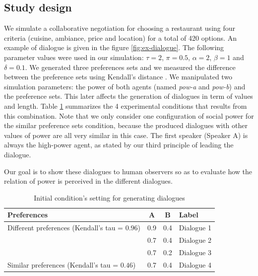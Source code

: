 \documentclass{llncs}
\begin{document}
	\subsection{Study design}
	We simulate a collaborative negotiation for choosing a restaurant using four criteria (cuisine, ambiance, price and location) for a total of 420 options. An example of dialogue is given in the figure \ref{fig:ex-dialogue}. The following parameter values were used in our simulation: $\tau=2$, $\pi=0.5$, $\alpha=2$, $\beta=1$ and $\delta=0.1$. We generated three preferences sets and we measured the difference between the preference sets using Kendall's distance \cite{bra2013Kendall}. We manipulated two simulation parameters: the power of both agents (named \emph{pow-a} and \emph{pow-b}) and the preference sets. This later affects the generation of dialogues in term of values and length.  Table \ref{table:conditions} summarizes the 4 experimental conditions that results from this combination. Note that we only consider one configuration of social power for the similar preference sets condition, because the produced dialogues with other values of power are all very similar in this case. The first speaker (Speaker A) is always the high-power agent, as stated by our third principle of leading the dialogue.
	
	
	Our goal is to show these dialogues to human observers so as to evaluate how the relation of power is perceived in the different dialogues.
	\begin{table}[t]
		\centering
		\begin{tabular}{ |l|c|c|l| }
			\hline
			\textbf{Preferences}& \textbf{A} & \textbf{B} & \textbf{Label} \\ 
			\hline
			\newline\multirow{3}{*} {Different preferences (Kendall's tau = $0.96$)} & 0.9 & 0.4 & Dialogue 1 \\ \cline{2-4}
			
			\newline  & 0.7 & 0.4 & Dialogue 2\\ \cline{2-4}
			
			\newline   &0.7 & 0.2 & Dialogue 3\\ 
			\hline
			\newline Similar preferences (Kendall's tau = $0.46$) & 0.7 & 0.4 & Dialogue 4\\
			\hline
		\end{tabular}
		\caption{Initial condition's setting for generating dialogues} 
		\label{table:conditions}
	\end{table}
	
\end{document}
